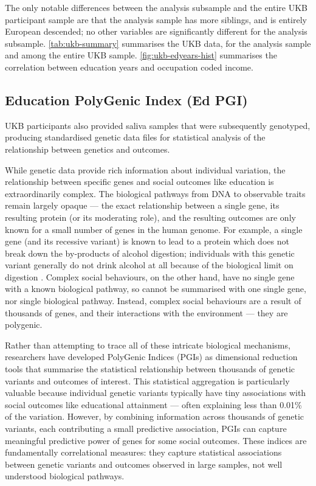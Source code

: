 The only notable differences between the analysis subsample and the entire UKB participant sample are that the analysis sample has more siblings, and is entirely European descended; no other variables are significantly different for the analysis subsample.
\autoref{tab:ukb-summary} summarises the UKB data, for the analysis sample and among the entire UKB sample.
\autoref{fig:ukb-edyears-hist} summarises the correlation between education years and occupation coded income.

\subsection{Education PolyGenic Index (Ed PGI)}
\label{sec:ed-pgi}
UKB participants also provided saliva samples that were subsequently genotyped, producing standardised genetic data files for statistical analysis of the relationship between genetics and outcomes.

While genetic data provide rich information about individual variation, the relationship between specific genes and social outcomes like education is extraordinarily complex.
The biological pathways from DNA to observable traits remain largely opaque --- the exact relationship between a single gene, its resulting protein (or its moderating role), and the resulting outcomes are only known for a small number of genes in the human genome.
For example, a single gene (and its recessive variant) is known to lead to a protein which does not break down the by-products of alcohol digestion; individuals with this genetic variant generally do not drink alcohol at all because of the biological limit on digestion \citep{millwood2023alcohol}.
Complex social behaviours, on the other hand, have no single gene with a known biological pathway, so cannot be summarised with one single gene, nor single biological pathway.
Instead, complex social behaviours are a result of thousands of genes, and their interactions with the environment --- they are polygenic.

Rather than attempting to trace all of these intricate biological mechanisms, researchers have developed PolyGenic Indices (PGIs) as dimensional reduction tools that summarise the statistical relationship between thousands of genetic variants and outcomes of interest.
This statistical aggregation is particularly valuable because individual genetic variants typically have tiny associations with social outcomes like educational attainment --- often explaining less than 0.01\% of the variation.
However, by combining information across thousands of genetic variants, each contributing a small predictive association, PGIs can capture meaningful predictive power of genes for some social outcomes.
These indices are fundamentally correlational measures: they capture statistical associations between genetic variants and outcomes observed in large samples, not well understood biological pathways.

